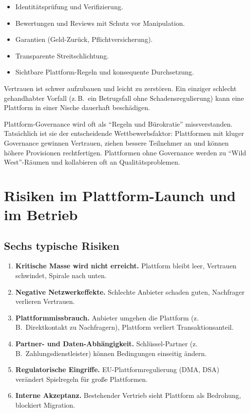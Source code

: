\documentclass[11pt,a4paper,oneside]{article}
\newcommand{\fachbegriff}[1]{\textbf{#1}}
\begin{document}
\begin{itemize}
  \item Identitätsprüfung und Verifizierung.
  \item Bewertungen und Reviews mit Schutz vor Manipulation.
  \item Garantien (Geld-Zurück, Pflichtversicherung).
  \item Transparente Streitschlichtung.
  \item Sichtbare Plattform-Regeln und konsequente Durchsetzung.
\end{itemize}

Vertrauen ist schwer aufzubauen und leicht zu zerstören. Ein einziger schlecht gehandhabter Vorfall (z.\,B.\ ein Betrugsfall ohne Schadensregulierung) kann eine Plattform in einer Nische dauerhaft beschädigen.

\begin{merkbox}
Plattform-Governance wird oft als ``Regeln und Bürokratie'' missverstanden. Tatsächlich ist sie der entscheidende Wettbewerbsfaktor: Plattformen mit kluger Governance gewinnen Vertrauen, ziehen bessere Teilnehmer an und können höhere Provisionen rechtfertigen. Plattformen ohne Governance werden zu ``Wild West''-Räumen und kollabieren oft an Qualitätsproblemen.
\end{merkbox}

\section{Risiken im Plattform-Launch und im Betrieb}

\subsection{Sechs typische Risiken}

\begin{enumerate}
  \item \fachbegriff{Kritische Masse wird nicht erreicht.} Plattform bleibt leer, Vertrauen schwindet, Spirale nach unten.
  \item \fachbegriff{Negative Netzwerkeffekte.} Schlechte Anbieter schaden guten, Nachfrager verlieren Vertrauen.
  \item \fachbegriff{Plattformmissbrauch.} Anbieter umgehen die Plattform (z.\,B.\ Direktkontakt zu Nachfragern), Plattform verliert Transaktionsanteil.
  \item \fachbegriff{Partner- und Daten-Abhängigkeit.} Schlüssel-Partner (z.\,B.\ Zahlungsdienstleister) können Bedingungen einseitig ändern.
  \item \fachbegriff{Regulatorische Eingriffe.} EU-Plattformregulierung (DMA, DSA) verändert Spielregeln für große Plattformen.
  \item \fachbegriff{Interne Akzeptanz.} Bestehender Vertrieb sieht Plattform als Bedrohung, blockiert Migration.
\end{enumerate}
\end{document}
